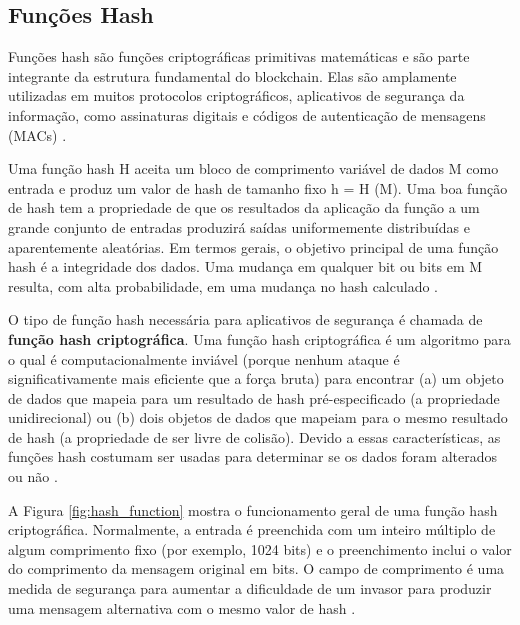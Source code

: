     \subsection{Funções Hash}
        
        Funções hash são funções criptográficas primitivas matemáticas e são parte integrante da estrutura fundamental do blockchain. Elas são amplamente utilizadas em muitos protocolos criptográficos, aplicativos de segurança da informação, como assinaturas digitais e códigos de autenticação de mensagens (MACs)  \cite{beginnig_blockchain_bikramaditya}.
        
        Uma função hash H aceita um bloco de comprimento variável de dados M como entrada e produz um valor de hash de tamanho fixo h = H (M). Uma boa função de hash tem a propriedade de que os resultados da aplicação da função a um grande conjunto de entradas produzirá saídas uniformemente distribuídas e aparentemente aleatórias. Em termos gerais, o objetivo principal de uma função hash é a integridade dos dados. Uma mudança em qualquer bit ou bits em M resulta, com alta probabilidade, em uma mudança no hash calculado \cite{cryptograpy_and_network_stallings}.
        
        O tipo de função hash necessária para aplicativos de segurança é chamada de \textbf{função hash criptográfica}. Uma função hash criptográfica é um algoritmo para o qual é computacionalmente inviável (porque nenhum ataque é significativamente mais eficiente que a força bruta) para encontrar (a) um objeto de dados que mapeia para um resultado de hash pré-especificado (a propriedade unidirecional) ou (b) dois objetos de dados que mapeiam para o mesmo resultado de hash (a propriedade de ser livre de colisão). Devido a essas características, as funções hash costumam ser usadas para determinar se os dados foram alterados ou não \cite{cryptograpy_and_network_stallings}.

        A Figura \ref{fig:hash_function} mostra o funcionamento geral de uma função hash criptográfica. Normalmente, a entrada é preenchida com um inteiro múltiplo de algum comprimento fixo (por exemplo, 1024 bits) e o preenchimento inclui o valor do comprimento da mensagem original em bits. O campo de comprimento é uma medida de segurança para aumentar a dificuldade de um invasor para produzir uma mensagem alternativa com o mesmo valor de hash \cite{cryptograpy_and_network_stallings}.
    
